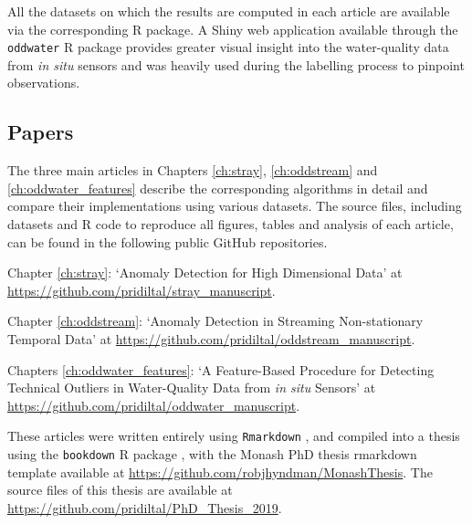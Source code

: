 \documentclass{monashthesis}
\theoremstyle{definition}
\theoremstyle{definition}
\theoremstyle{definition}
\theoremstyle{remark}
\begin{document}
All the datasets on which the results are computed in each article are available via the corresponding R package. A Shiny web application available through the \texttt{oddwater} R package provides greater visual insight into the water-quality data from \emph{in situ} sensors and was heavily used during the labelling process to pinpoint observations.

\hypertarget{papers}{%
\subsection{Papers}\label{papers}}

The three main articles in Chapters \ref{ch:stray}, \ref{ch:oddstream} and \ref{ch:oddwater_features} describe the corresponding algorithms in detail and compare their implementations using various datasets. The source files, including datasets and R code to reproduce all figures, tables and analysis of each article, can be found in the following public GitHub repositories.

Chapter \ref{ch:stray}: `Anomaly Detection for High Dimensional Data' at \url{https://github.com/pridiltal/stray_manuscript}.

Chapter \ref{ch:oddstream}: `Anomaly Detection in Streaming Non-stationary Temporal Data' at \url{https://github.com/pridiltal/oddstream_manuscript}.

Chapters \ref{ch:oddwater_features}: `A Feature-Based Procedure for Detecting Technical Outliers in Water-Quality Data from \emph{in situ} Sensors' at \url{https://github.com/pridiltal/oddwater_manuscript}.

These articles were written entirely using \texttt{Rmarkdown} \autocite{Rmarkdown1}, and compiled into a thesis using the \texttt{bookdown} R package \autocite{Rbookdown1}, with the Monash PhD thesis rmarkdown template available at \url{https://github.com/robjhyndman/MonashThesis}. The source files of this thesis are available at \url{https://github.com/pridiltal/PhD_Thesis_2019}.

\printbibliography[heading=bibintoc]
\end{document}

